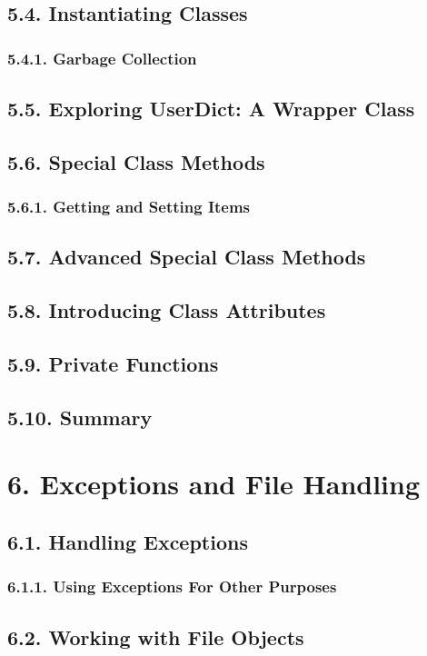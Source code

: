 \documentclass[oneside,12pt]{book}
\begin{document}
\section{5.4. Instantiating Classes}
\subsection{5.4.1. Garbage Collection}
       
\section{5.5. Exploring UserDict: A Wrapper Class}
\section{5.6. Special Class Methods}
\subsection{5.6.1. Getting and Setting Items}
       
\section{5.7. Advanced Special Class Methods}
\section{5.8. Introducing Class Attributes}
\section{5.9. Private Functions}
\section{5.10. Summary}
   
\chapter{6. Exceptions and File Handling}
\section{6.1. Handling Exceptions}
\subsection{6.1.1. Using Exceptions For Other Purposes}
       
\section{6.2. Working with File Objects}
\end{document}
